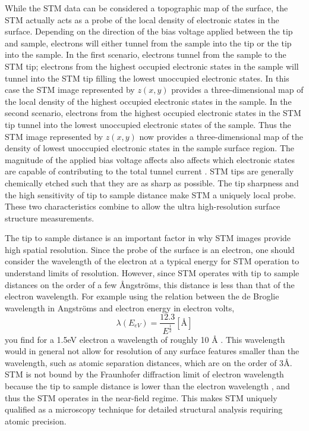 While the STM data can be considered a topographic map of the surface, the STM actually acts as a probe of the local density of electronic states in the surface. Depending on the direction of the bias voltage applied between the tip and sample, electrons will either tunnel from the sample into the tip or the tip into the sample. In the first scenario, electrons tunnel from the sample to the STM tip; electrons from the highest occupied electronic states in the sample will tunnel into the STM tip filling the lowest unoccupied electronic states. In this case the STM image represented by $z(x,y)$ provides a three-dimensional map of the local density of the highest occupied electronic states in the sample. In the second scenario, electrons from the highest occupied electronic states in the STM tip tunnel into the lowest unoccupied electronic states of the sample. Thus the STM image represented by $z(x,y)$ now provides a three-dimensional map of the density of lowest unoccupied electronic states in the sample surface region. The magnitude of the applied bias voltage affects also affects which electronic states are capable of contributing to the total tunnel current \cite{STM-I}. STM tips are generally chemically etched such that they are as sharp as possible. The tip sharpness and the high sensitivity of tip to sample distance make STM a uniquely local probe. These two characteristics combine to allow the ultra high-resolution surface structure measurements.

The tip to sample distance is an important factor in why STM images provide high spatial resolution. Since the probe of the surface is an electron, one should consider the wavelength of the electron at a typical energy for STM operation to understand limits of resolution. However, since STM operates with tip to sample distances on the order of a few {\AA}ngstr\"oms, this distance is less than that of the electron wavelength. For example using the relation between the de Broglie wavelength in Angstr\"oms and electron energy in electron volts, 
\begin{equation}
\lambda(E_{eV}) = \frac{12.3}{E^\frac{1}{2}} {[\text{\AA}]}
\end{equation} you find for a 1.5eV electron a wavelength of roughly 10 {\AA} \cite{Ashcroft}. This wavelength would in general not allow for resolution of any surface features smaller than the wavelength, such as atomic separation distances, which are on the order of 3{\AA}. STM is not bound by the Fraunhofer diffraction limit of electron wavelength because the tip to sample distance is lower than the electron wavelength \cite{SPM-methods}, and thus the STM operates in the near-field regime.  This makes STM uniquely qualified as a microscopy technique for detailed structural analysis requiring atomic precision.

